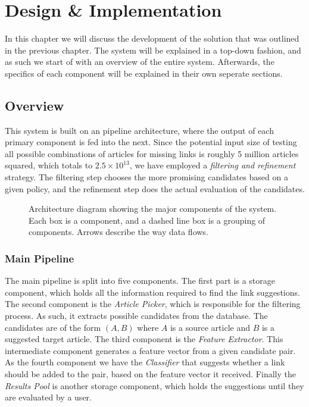 \chapter{Design \& Implementation}\label{chap:design}
In this chapter we will discuss the development of the solution that was outlined in the previous chapter. The system will be explained in a top-down fashion, and as such we start of with an overview of the entire system. Afterwards, the specifics of each component will be explained in their own seperate sections.

\section{Overview}\label{sec:design_overview}
This system is built on an pipeline architecture, where the output of each primary component is fed into the next. Since the potential input size of testing all possible combinations of articles for missing links is roughly 5 million articles squared, which totals to $2.5 \times 10^{13}$, we have employed a \emph{filtering and refinement} strategy. The filtering step chooses the more promising candidates based on a given policy, and the refinement step does the actual evaluation of the candidates.

\begin{figure}[tb]%
  \centering
  
\caption[Architecture diagram showing the major components of the system]{Architecture diagram showing the major components of the system. Each box is a component, and a dashed line box is a grouping of components. Arrows describe the way data flows.}%
\label{fig:system-overview}%
\end{figure}

\subsection{Main Pipeline}
The main pipeline is split into five components. The first part is a storage component, which holds all the information required to find the link suggestions. The second component is the \emph{Article Picker}, which is responsible for the filtering process. As such, it extracts possible candidates from the database. The candidates are of the form $(A,B)$ where $A$ is a source article and $B$ is a suggested target article. The third component is the \emph{Feature Extractor}. This intermediate component generates a feature vector from a given candidate pair. As the fourth component we have the \emph{Classifier} that suggests whether a link should be added to the pair, based on the feature vector it received. Finally the \emph{Results Pool} is another storage component, which holds the suggestions until they are evaluated by a user.

